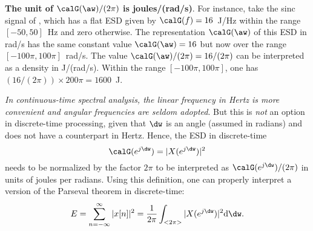 \bExample \textbf{The unit of $\calG(\aw)/(2 \pi)$ is joules/(rad/s)}. 
\label{ex:units_of_esd_psd}
For instance, take the sinc signal of 
, which has a flat ESD given by 
$\calG(f)=16$~J/Hz within the 
range $[-50,50]$~Hz and zero otherwise. The representation $\calG(\aw)$ of this ESD in 
rad/s has the same constant value $\calG(\aw)=16$ but now over the range $[-100\pi,100\pi]$~rad/s. 
The value $\calG(\aw)/(2 \pi)=16/(2 \pi)$ can be interpreted as a density in J/(rad/s). 
Within the range $[-100\pi,100\pi]$, one has $(16/(2 \pi)) \times 200 \pi = 1600$~J.
\eExample




\emph{In continuous-time spectral analysis, the linear frequency in Hertz is more convenient and angular frequencies are seldom adopted}. But this is \emph{not} an option in discrete-time processing, given that $\dw$ is an angle (assumed in radians) and does not have a counterpart in Hertz. Hence, 
the ESD in discrete-time 
\begin{equation}
\calG(e^{j \dw})= |X(e^{j \dw})|^2
\end{equation}
needs to be normalized by the factor $2 \pi$ to be interpreted as $\calG(e^{j \dw})/(2 \pi)$ in units of joules per radians.
Using this definition, one can properly interpret a version of the Parseval theorem in discrete-time:
\begin{equation}
E = \sum_{n=-\infty}^{\infty} |x[n]|^2 = \frac{1}{2 \pi}\int_{<2 \pi>} |X(e^{j \dw})|^2 \textrm{d}\dw.
\label{eq:parseval_dt}
\end{equation}


